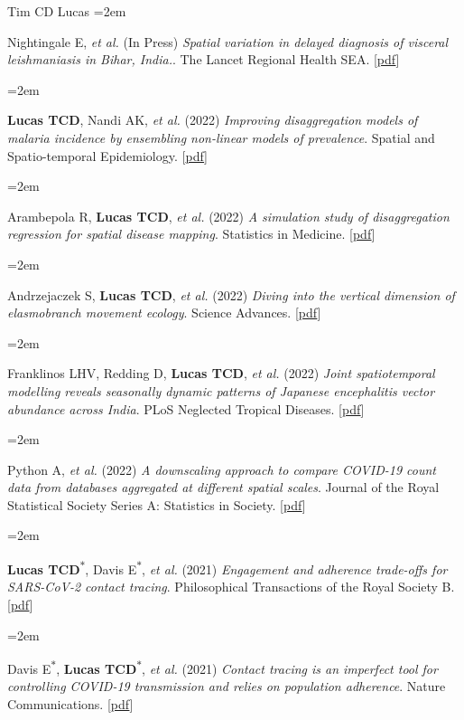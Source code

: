 \documentclass{scrartcl}
\newcommand{\MarginText}[1]{\marginpar{\raggedleft\itshape\small#1}} %
\newcommand{\Description}[1]{\hangindent=2em\hangafter=0\noindent\raggedright\footnotesize{#1}\par\normalsize\vspace{1em}} %
\begin{document}
\begin{cv}{Tim {\Large CD} Lucas}
\Description{Nightingale E, \emph{et al.} (In Press) \emph{Spatial variation in delayed diagnosis of visceral leishmaniasis in Bihar, India.}. The Lancet Regional Health SEA. [\href{https://papers.ssrn.com/sol3/papers.cfm?abstract_id=4233127}{pdf}]}



\Description{\MarginText{2022}\textbf{Lucas TCD}, Nandi AK,  \emph{et al.} (2022) \emph{ Improving disaggregation models of malaria incidence by ensembling non-linear models of prevalence}. Spatial and Spatio-temporal Epidemiology. [\href{https://reader.elsevier.com/reader/sd/pii/S1877584520300356?token=A7B0EF0114C0A057AD7F1E13B7F97FE4D359B945C1F09211AC50B77D272216014E3E9881E3FBFC7D3CA8A8DD5A78846A}{pdf}]}


\Description{Arambepola R, \textbf{Lucas TCD},  \emph{et al.} (2022) \emph{A simulation study of disaggregation regression for spatial disease mapping}. Statistics in Medicine. [\href{https://onlinelibrary.wiley.com/doi/full/10.1002/sim.9220}{pdf}]}



\Description{Andrzejaczek S, \textbf{Lucas TCD}, \emph{et al.} (2022) \emph{Diving into the vertical dimension of elasmobranch movement ecology}. Science Advances. [\href{https://www.science.org/doi/full/10.1126/sciadv.abo1754}{pdf}]}


\Description{Franklinos LHV, Redding D, \textbf{Lucas TCD},  \emph{et al.} (2022) \emph{Joint spatiotemporal modelling reveals seasonally dynamic patterns of Japanese encephalitis vector abundance across India}. PLoS Neglected Tropical Diseases. [\href{https://journals.plos.org/plosntds/article?id=10.1371/journal.pntd.0010218}{pdf}]}

\Description{Python A,  \emph{et al.} (2022) \emph{A downscaling approach to compare COVID-19 count data from databases aggregated at different spatial scales}. Journal of the Royal Statistical Society Series A: Statistics in Society. [\href{https://academic.oup.com/jrsssa/article/185/1/202/7068448}{pdf}]}




\Description{\MarginText{2021}\textbf{Lucas TCD}\textsuperscript{$\ast$}, Davis E\textsuperscript{$\ast$}, \emph{et al.} (2021) \emph{Engagement and adherence trade-offs for SARS-CoV-2 contact tracing}. Philosophical Transactions of the Royal Society B. [\href{https://royalsocietypublishing.org/doi/10.1098/rstb.2020.0270}{pdf}]}



\Description{Davis E\textsuperscript{$\ast$}, \textbf{Lucas TCD}\textsuperscript{$\ast$}, \emph{et al.} (2021) \emph{Contact tracing is an imperfect tool for controlling COVID-19 transmission and relies on population adherence}. Nature Communications. [\href{https://www.nature.com/articles/s41467-021-25531-5}{pdf}]}




\end{cv}
\end{document}
